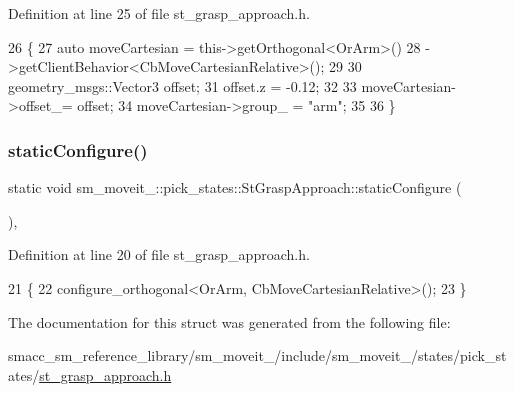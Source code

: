 Definition at line 25 of file st\+\_\+grasp\+\_\+approach.\+h.


\begin{DoxyCode}
26     \{
27         \textcolor{keyword}{auto} moveCartesian = this->getOrthogonal<OrArm>()
28                                 ->getClientBehavior<CbMoveCartesianRelative>();
29 
30         geometry\_msgs::Vector3 offset;
31         offset.z = -0.12;
32 
33         moveCartesian->offset\_= offset;
34         moveCartesian->group\_ = \textcolor{stringliteral}{"arm"};
35 
36     \}
\end{DoxyCode}
\mbox{\label{structsm__moveit__3_1_1pick__states_1_1StGraspApproach_ae692df25d8b4e0d175ba09399e680a4a}} 
\subsubsection{\texorpdfstring{static\+Configure()}{staticConfigure()}}
{\footnotesize\ttfamily static void sm\+\_\+moveit\+\_\+::pick\+\_\+states\+::\+St\+Grasp\+Approach\+::static\+Configure (\begin{DoxyParamCaption}{ }\end{DoxyParamCaption})\hspace{0.3cm}{\ttfamily [inline]}, {\ttfamily [static]}}



Definition at line 20 of file st\+\_\+grasp\+\_\+approach.\+h.


\begin{DoxyCode}
21     \{ 
22         configure\_orthogonal<OrArm, CbMoveCartesianRelative>();
23     \}
\end{DoxyCode}


The documentation for this struct was generated from the following file\+:\begin{DoxyCompactItemize}
\item 
smacc\+\_\+sm\+\_\+reference\+\_\+library/sm\+\_\+moveit\+\_/include/sm\+\_\+moveit\+\_/states/pick\+\_\+states/\hyperlink{3_2include_2sm__moveit__3_2states_2pick__states_2st__grasp__approach_8h}{st\+\_\+grasp\+\_\+approach.\+h}\end{DoxyCompactItemize}
